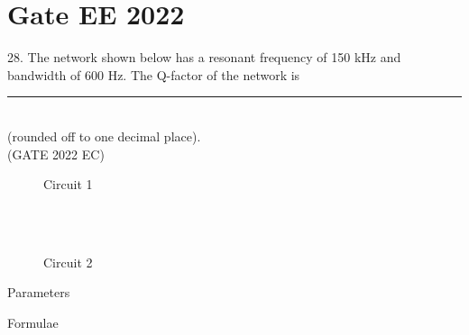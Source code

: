 \documentclass[journal,12pt,twocolumn]{IEEEtran}
\begin{document}


\vspace{3cm}

\title{}
\author{EE23BTECH11054 -  Sai Krishna Shanigarapu$^{*}$
}
\maketitle
\newpage
\bigskip

\section*{Gate EE 2022}
28. \hspace{2pt}The network shown below has a resonant frequency of 150 kHz and bandwidth of 600
Hz. The Q-factor of the network is \rule{1cm}{0.15mm}\\
(rounded off to one decimal place).\\
\hfill(GATE 2022 EC)\\
\begin{figure}[ht]
  \centering
  \begin{adjustbox}{width=\columnwidth}
      
  \end{adjustbox}
  \caption{Circuit 1}
\end{figure}\\
\solution\\

\begin{figure}[ht]
  \centering
  \begin{adjustbox}{width=\columnwidth}
      
  \end{adjustbox}
  \caption{Circuit 2}
\end{figure}


\begin{table}[ht]
    \centering
     \begin{adjustbox}{width=\columnwidth}
    
    \end{adjustbox}
    \caption{Parameters}
    \label{tab:tab1_gate_ee_2022_28_054}
\end{table}

\begin{table}[ht]
    \centering
     \begin{adjustbox}{width=\columnwidth}
    
    \end{adjustbox}
    \caption{Formulae}
    \label{tab:tab2_gate_ee_2022_28_054}
\end{table}
\end{document}

